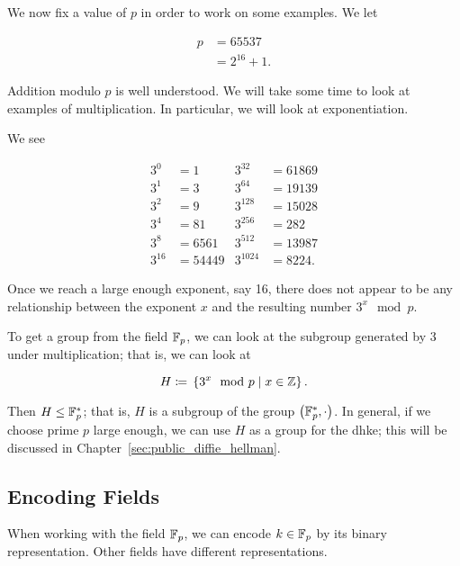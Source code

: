 \begin{example}
\label{example:math_field_p_more}

We now fix a value of $p$ in order to work on some examples.
We let

\begin{align}
    p &= 65537 \nonumber\\
        &= 2^{16} + 1.
\end{align}

Addition modulo $p$ is well understood.
We will take some time to look at examples of multiplication.
In particular, we will look at exponentiation.

We see

\begin{align}
    3^{0}  &= 1
        &
    3^{32}  &= 61869 \nonumber\\
    3^{1}  &= 3
        &
    3^{64}  &= 19139 \nonumber\\
    3^{2}  &= 9
        &
    3^{128}  &= 15028 \nonumber\\
    3^{4}  &= 81
        &
    3^{256}  &= 282 \nonumber\\
    3^{8}  &= 6561
        &
    3^{512}  &= 13987 \nonumber\\
    3^{16} &= 54449
        &
    3^{1024}  &= 8224.
\end{align}

\noindent
Once we reach a large enough exponent, say 16,
there does not appear to be any relationship between the exponent
$x$ and the resulting number $3^{x}\mod p$.

To get a \gls{group} from the \gls{field} $\mathbb{F}_{p}$,
we can look at the \gls{subgroup}
generated by 3 under multiplication;
that is, we can look at

\begin{equation}
    H \coloneqq{} \left\{ 3^{x} \mod p \mid x\in\mathbb{Z} \right\}.
\end{equation}

\noindent
Then $H\le \mathbb{F}_{p}^{*}$; that is, $H$ is a \gls{subgroup} of the \gls{group}
$\left( \mathbb{F}_{p}^{*},\cdot \right)$.
In general, if we choose prime $p$ large enough,
we can use $H$ as a \gls{group} for the \gls{dhke};
this will be discussed in Chapter~\ref{sec:public_diffie_hellman}.
\end{example}

\subsection{Encoding Fields}

When working with the \gls{field} $\mathbb{F}_{p}$, we can encode $k\in\mathbb{F}_{p}$
by its binary representation.
Other \glspl{field} have different representations.
